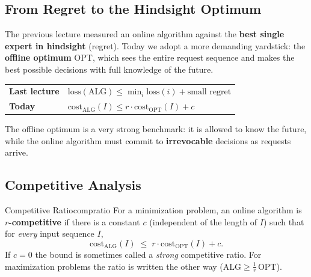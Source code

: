 %                         

\subsection{From Regret to the Hindsight Optimum}

The previous lecture measured an online algorithm against the \textbf{best single expert in hindsight} (regret). Today we adopt a more demanding yardstick: the \textbf{offline optimum} $\mathrm{OPT}$, which sees the entire request sequence and makes the best possible decisions with full knowledge of the future.

\begin{center}
\begin{tabular}{ll}
\toprule
\textbf{Last lecture} & $\mathrm{loss}(\mathrm{ALG}) \le \min_i \mathrm{loss}(i) + \text{small regret}$ \\
\textbf{Today} & $\mathrm{cost}_{\mathrm{ALG}}(I) \le r \cdot \mathrm{cost}_{\mathrm{OPT}}(I) + c$ \\
\bottomrule
\end{tabular}
\end{center}

The offline optimum is a very strong benchmark: it is allowed to know the future, while the online algorithm must commit to \textbf{irrevocable} decisions as requests arrive.

\subsection{Competitive Analysis}

\begin{definition}{Competitive Ratio}{compratio}
For a minimization problem, an online algorithm is \textbf{$r$-competitive} if there is a constant $c$ (independent of the length of $I$) such that for \emph{every} input sequence $I$,
\[
\mathrm{cost}_{\mathrm{ALG}}(I) \;\le\; r \cdot \mathrm{cost}_{\mathrm{OPT}}(I) + c.
\]
If $c = 0$ the bound is sometimes called a \emph{strong} competitive ratio. For maximization problems the ratio is written the other way ($\mathrm{ALG} \ge \tfrac1r\,\mathrm{OPT}$).
\end{definition}


